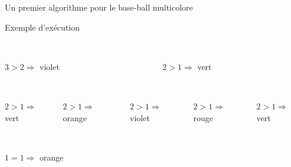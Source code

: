 \documentclass[final,hyperref={pdfpagelabels=false}]{beamer}
\renewcommand*{\small}{\fontsize{\resultsmallX}{\resultsmallY}\selectfont}
\begin{document}
\begin{frame}{Un premier algorithme pour le base-ball multicolore}
\begin{block}{Exemple d'exécution}
\begin{columns}
      \begin{column}{.15\linewidth}\center
        \\
        {\small $3>2\Rightarrow$ violet}        
      \end{column}
      \begin{column}{.15\linewidth}\center
        \\
        {\small $2>1\Rightarrow$ vert}        
      \end{column}
    \end{columns}
    \begin{columns}
      \begin{column}{.15\linewidth}\center
        \\
        {\small $2>1\Rightarrow$ vert}        
      \end{column}

      \begin{column}{.15\linewidth}\center
        \\
         {\small $2>1\Rightarrow$ orange}        
      \end{column}

      \begin{column}{.15\linewidth}\center
        \\
         {\small $2>1\Rightarrow$ violet}        
      \end{column}

      \begin{column}{.15\linewidth}\center
        \\
         {\small $2>1\Rightarrow$ rouge}        
      \end{column}
      \begin{column}{.15\linewidth}\center
        \\
         {\small $2>1\Rightarrow$ vert}        
      \end{column}
    \end{columns}
    \begin{columns}
      \begin{column}{.15\linewidth}\center
        \\
         {\small $1=1\Rightarrow$ orange}        
      \end{column}


\end{columns}
\end{block}
\end{frame}
\end{document}

